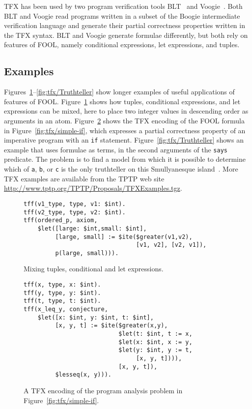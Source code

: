 TFX has been used by two program verification tools BLT~\cite{CF-iFM17} and
Voogie~\cite{KKV18}. 
Both BLT and Voogie read programs written in a subset of the Boogie 
intermediate verification language and generate their partial correctness 
properties written in the TFX syntax. 
BLT and Voogie generate formulae differently, but both rely on features of 
FOOL, namely conditional expressions, let expressions, and tuples.

\subsection{Examples}
\label{sec:tfx/Examples}

Figures~\ref{fig:tfx/TupleConditionalLet}--\ref{fig:tfx/Truthteller} show longer examples of
useful applications of features of FOOL. 
Figure~\ref{fig:tfx/TupleConditionalLet} shows how tuples, conditional expressions, 
and let expressions can be mixed, here to place two integer values in 
descending order as arguments in an atom. 
Figure~\ref{fig:tfx/LetITE} shows the TFX encoding of the FOOL formula in 
Figure~\ref{fig:tfx/simple-if}, which expresses a partial correctness property 
of an imperative program with an \texttt{if} statement. 
Figure~\ref{fig:tfx/Truthteller} shows an example that uses formulae as terms, in 
the second arguments of the \lstinline'says' predicate. 
The problem is to find a model from which it is possible to determine which 
of \lstinline'a', \lstinline'b', or \lstinline'c' is the only truthteller on this Smullyanesque 
island~\cite{Smu78}. 
More TFX examples are available from the TPTP web site 
\url{http://www.tptp.org/TPTP/Proposals/TFXExamples.tgz}.

\begin{figure}[ht]
\begin{lstlisting}[language=tptp]
tff(v1_type, type, v1: $int).
tff(v2_type, type, v2: $int).
tff(ordered_p, axiom,
    $let([large: $int,small: $int],
         [large, small] := $ite($greater(v1,v2),
                                [v1, v2], [v2, v1]),
         p(large, small))).
\end{lstlisting}
\caption{Mixing tuples, conditional and let expressions.}
\label{fig:tfx/TupleConditionalLet}
\end{figure}

\begin{figure}[ht]
\begin{lstlisting}[language=tptp]
tff(x, type, x: $int).
tff(y, type, y: $int).
tff(t, type, t: $int).
tff(x_leq_y, conjecture,
    $let([x: $int, y: $int, t: $int],
         [x, y, t] := $ite($greater(x,y),
                           $let(t: $int, t := x,
                           $let(x: $int, x := y,
                           $let(y: $int, y := t,
                                [x, y, t]))),
                           [x, y, t]),
         $lesseq(x, y))).
\end{lstlisting}
\caption{A TFX encoding of the program analysis problem in
Figure~\ref{fig:tfx/simple-if}.}
\label{fig:tfx/LetITE}
\end{figure}

